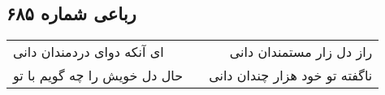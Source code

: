 \begin{center}
\section*{رباعی شماره ۶۸۵}
\label{sec:sh685}
\begin{longtable}{l p{0.5cm} r}
ای آنکه دوای دردمندان دانی
&&
راز دل زار مستمندان دانی
\\
حال دل خویش را چه گویم با تو
&&
ناگفته تو خود هزار چندان دانی
\\
\end{longtable}
\end{center}

